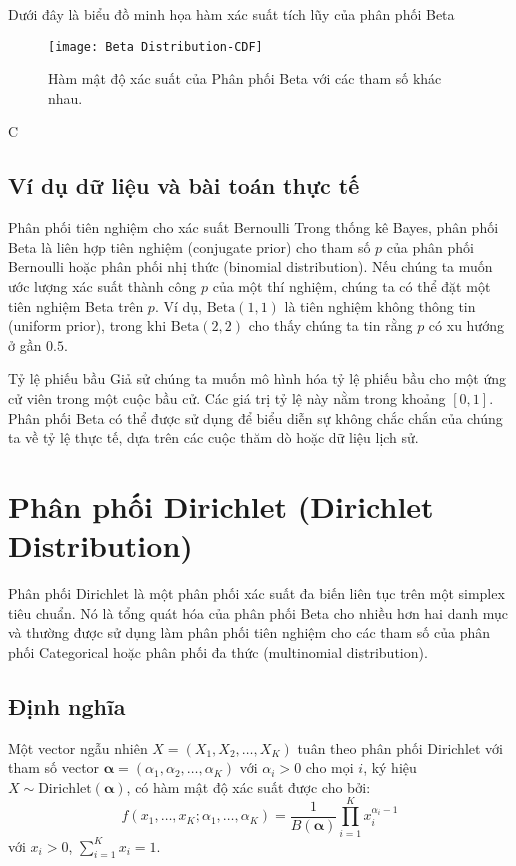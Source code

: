 	Dưới đây là biểu đồ minh họa hàm xác suất tích lũy của phân phối Beta
	
		\begin{figure}[h!]
		\centering
		\texttt{[image: Beta Distribution-CDF]} %
		\caption{Hàm mật độ xác suất của Phân phối Beta với các tham số khác nhau.}
		\label{fig:Beta Distribution-CDF}
	\end{figure}C
	
	\subsection{Ví dụ dữ liệu và bài toán thực tế}
		Phân phối tiên nghiệm cho xác suất Bernoulli
		Trong thống kê Bayes, phân phối Beta là liên hợp tiên nghiệm (conjugate prior) cho tham số $p$ của phân phối Bernoulli hoặc phân phối nhị thức (binomial distribution). Nếu chúng ta muốn ước lượng xác suất thành công $p$ của một thí nghiệm, chúng ta có thể đặt một tiên nghiệm Beta trên $p$. Ví dụ, $\text{Beta}(1,1)$ là tiên nghiệm không thông tin (uniform prior), trong khi $\text{Beta}(2,2)$ cho thấy chúng ta tin rằng $p$ có xu hướng ở gần $0.5$.
	
		Tỷ lệ phiếu bầu
		Giả sử chúng ta muốn mô hình hóa tỷ lệ phiếu bầu cho một ứng cử viên trong một cuộc bầu cử. Các giá trị tỷ lệ này nằm trong khoảng $[0, 1]$. Phân phối Beta có thể được sử dụng để biểu diễn sự không chắc chắn của chúng ta về tỷ lệ thực tế, dựa trên các cuộc thăm dò hoặc dữ liệu lịch sử.
	
\section{Phân phối Dirichlet (Dirichlet Distribution)}
	Phân phối Dirichlet là một phân phối xác suất đa biến liên tục trên một simplex tiêu chuẩn. Nó là tổng quát hóa của phân phối Beta cho nhiều hơn hai danh mục và thường được sử dụng làm phân phối tiên nghiệm cho các tham số của phân phối Categorical hoặc phân phối đa thức (multinomial distribution).
	
	\subsection{Định nghĩa}
		Một vector ngẫu nhiên $X = (X_1, X_2, \dots, X_K)$ tuân theo phân phối Dirichlet với tham số vector $\boldsymbol{\alpha} = (\alpha_1, \alpha_2, \dots, \alpha_K)$ với $\alpha_i > 0$ cho mọi $i$, ký hiệu $X \sim \text{Dirichlet}(\boldsymbol{\alpha})$, có hàm mật độ xác suất được cho bởi:
		\[ f(x_1, \dots, x_K; \alpha_1, \dots, \alpha_K) = \frac{1}{B(\boldsymbol{\alpha})} \prod_{i=1}^K x_i^{\alpha_i-1} \]
		với $x_i > 0$, $\sum_{i=1}^K x_i = 1$.
		
